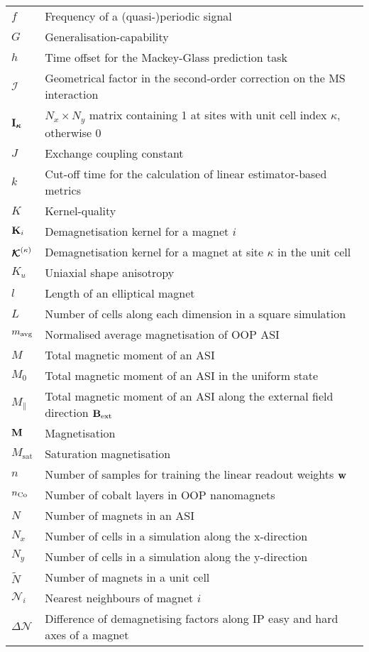 \begin{longtable}[l]{p{60pt} p{350pt}}
	$f$ & Frequency of a (quasi-)periodic signal \\[\whiteline]

	$G$ & Generalisation-capability \\[\whiteline]

	$h$ & Time offset for the Mackey-Glass prediction task \\[\whiteline]

	$\mathcal{I}$ & Geometrical factor in the second-order correction on the MS interaction \\
	$\boldsymbol{\mathbf{I_\kappa}}$ & $N_x \times N_y$ matrix containing 1 at sites with unit cell index $\kappa$, otherwise 0 \\[\whiteline]

	$J$ & Exchange coupling constant \\[\whiteline]

	$k$ & Cut-off time for the calculation of linear estimator-based metrics \\
	$K$ & Kernel-quality \\ %
	$\boldsymbol{\mathbf{K}}_i$ & Demagnetisation kernel for a magnet $i$ \\
	$\boldsymbol{\mathbf{\mathcal{K}}}^{(\kappa)}$ & Demagnetisation kernel for a magnet at site $\kappa$ in the unit cell \\
	$K_u$ & Uniaxial shape anisotropy \\[\whiteline]

	$l$ & Length of an elliptical magnet \\
	$L$ & Number of cells along each dimension in a square simulation \\[\whiteline]

	$m_\mathrm{avg}$ & Normalised average magnetisation of OOP ASI \\
	$M$ & Total magnetic moment of an ASI \\
	$M_0$ & Total magnetic moment of an ASI in the uniform state \\
	$M_\parallel$ & Total magnetic moment of an ASI along the external field direction $\boldsymbol{\mathbf{B}}_\mathrm{ext}$ \\
	$\boldsymbol{\mathbf{M}}$ & Magnetisation \\
	$M_\mathrm{sat}$ & Saturation magnetisation \\[\whiteline]

	$n$ & Number of samples for training the linear readout weights $\boldsymbol{\mathbf{w}}$ \\
	$n_{\ce{Co}}$ & Number of cobalt layers in OOP nanomagnets \\
	$N$ & Number of magnets in an ASI \\
	$N_x$ & Number of cells in a simulation along the x-direction \\
	$N_y$ & Number of cells in a simulation along the y-direction \\
	$\widetilde{N}$ & Number of magnets in a unit cell \\
	$\mathcal{N}_i$ & Nearest neighbours of magnet $i$ \\
	$\Delta \mathcal{N}$ & Difference of demagnetising factors along IP easy and hard axes of a magnet \\[\whiteline]


\end{longtable}
